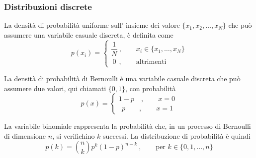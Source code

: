\subsubsection{Distribuzioni discrete}
\begin{definition} La densità di probabilità uniforme sull' insieme dei valore $\{x_1, x_2, \dots, x_N \}$ che può assumere una variabile casuale discreta, è definita come
    \begin{equation}
        p(x_i) = \begin{cases}
            \dfrac{1}{N} \ , \qquad x_i \in \{x_1, \dots, x_N\} \\
            \ 0        \ \ , \qquad \text{altrimenti}
        \end{cases}
    \end{equation}
\end{definition}
\begin{definition} La densità di probabilità di Bernoulli è una variabile casuale discreta che può assumere due valori, qui chiamati $\{0, 1\}$, con probabilità
    \begin{equation}
        p(x) = \begin{cases}
            1 - p   \quad , \qquad x = 0 \\
            \ \ p  \qquad , \qquad x = 1
        \end{cases}
    \end{equation}
\end{definition}
\begin{definition}
    La variabile binomiale rappresenta la probabilità che, in un processo di Bernoulli di dimensione $n$, si verifichino $k$ successi. La distribuzione di probabilità è quindi
    \begin{equation}
        p(k) = \binom{n}{k} p^k ( 1 - p )^{n-k} \ , \qquad \text{per $k \in \{0, 1, \dots, n\}$}
    \end{equation}
\end{definition}

\begin{definition}
\end{definition}

